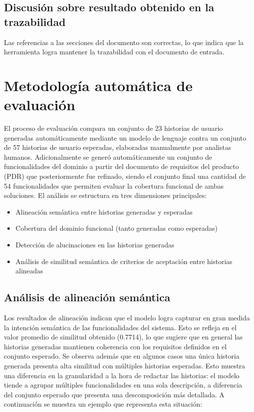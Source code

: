 \subsection{Discusión sobre resultado obtenido en la trazabilidad}
Las referencias a las secciones del documento son correctas, lo que indica que la herramienta logra mantener la trazabilidad con el documento de entrada.

\section{Metodología automática de evaluación}
El proceso de evaluación compara un conjunto de 23 historias de usuario generadas automáticamente mediante un modelo de lenguaje contra un conjunto de 57 historias de usuario esperadas, elaboradas manualmente por analistas humanos. Adicionalmente se generó automáticamente un conjunto de funcionalidades del dominio a partir del documento de requisitos del producto (PDR) que posteriormente fue refinado, siendo el conjunto final una cantidad de 54 funcionalidades que permiten evaluar la cobertura funcional de ambas soluciones.
El análisis se estructura en tres dimensiones principales:
\begin{itemize}
    \item Alineación semántica entre historias generadas y esperadas 
    \item Cobertura del dominio funcional (tanto generadas como esperadas)
    \item Detección de alucinaciones en las historias generadas 
    \item Análisis de similitud semántica de criterios de aceptación entre historias alineadas
\end{itemize}

\subsection{Análisis de alineación semántica}
Los resultados de alineación indican que el modelo logra capturar en gran medida la intención semántica de las funcionalidades del sistema. Esto se refleja en el valor promedio de similitud obtenido (0.7714), lo que sugiere que en general las historias generadas mantienen coherencia con los requisitos definidos en el conjunto esperado. 
Se observa además que en algunos casos una única historia generada presenta alta similitud con múltiples historias esperadas. Esto muestra una diferencia en la granularidad a la hora de redactar las historias: el modelo tiende a agrupar múltiples funcionalidades en una sola descripción, a diferencia del conjunto esperado que presenta una descomposición más detallada. A continuación se muestra un ejemplo que representa esta situación:

